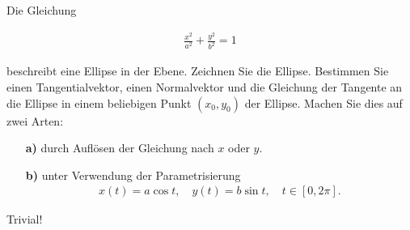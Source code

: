 \begin{exercise}

Die Gleichung

\begin{align*}
  \frac{x^2}{a^2} + \frac{y^2}{b^2} = 1
\end{align*}

beschreibt eine Ellipse in der Ebene. Zeichnen Sie die Ellipse. Bestimmen Sie einen Tangentialvektor, einen Normalvektor und die Gleichung der Tangente an die Ellipse in einem beliebigen Punkt $(x_0, y_0)$ der Ellipse. Machen Sie dies auf zwei Arten:

\begin{itemize}

  \item[\textbf{a)}] durch Auflösen der Gleichung nach $x$ oder $y$.

  \item[\textbf{b)}] unter Verwendung der Parametrisierung
  \begin{align*}
    x(t) = a \cos{t},
    \quad
    y(t) = b \sin{t},
    \quad
    t \in [0, 2 \pi].
  \end{align*}

\end{itemize}

\end{exercise}

\begin{solution}

Trivial!

\end{solution}
